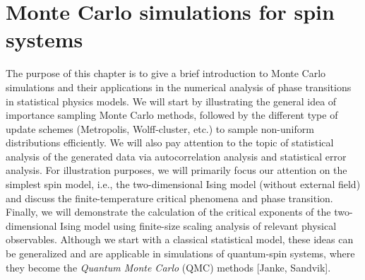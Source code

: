 \documentclass[../journal_main.tex]{subfiles}
\begin{document}
\chapter{Monte Carlo simulations for spin systems}
The purpose of this chapter is to give a brief introduction to Monte Carlo simulations and their applications in the numerical analysis of phase transitions in statistical physics models. We will start by illustrating the general idea of importance sampling Monte Carlo methods, followed by the different type of update schemes (Metropolis, Wolff-cluster, etc.) to sample non-uniform distributions efficiently. We will also pay attention to the topic of statistical analysis of the generated data via autocorrelation analysis and statistical error analysis. For illustration purposes, we will primarily focus our attention on the simplest spin model, i.e., the two-dimensional Ising model (without external field) and discuss the finite-temperature critical phenomena and phase transition. Finally, we will demonstrate the calculation of the critical exponents of the two-dimensional Ising model using finite-size scaling analysis of relevant physical observables. Although we start with a classical statistical model, these ideas can be generalized and are applicable in simulations of quantum-spin systems, where they become the \textit{Quantum Monte Carlo} (QMC) methods [Janke, Sandvik]. 
\end{document}
